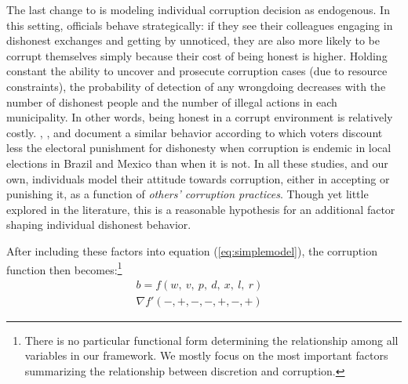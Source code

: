 \documentclass[11pt]{article}
\begin{document}
The last change to \citet{OlkenCorruptionDevelopingCountries2012b} is modeling individual corruption decision as endogenous. In this setting, officials behave strategically: if they see their colleagues engaging in dishonest exchanges and getting by unnoticed, they are also more likely to be corrupt themselves simply because their cost of being honest is higher. Holding constant the ability to uncover and prosecute corruption cases (due to resource constraints), the probability of detection of any wrongdoing decreases with the number of dishonest people and the number of illegal actions in each municipality. In other words, being honest in a corrupt environment is relatively costly. \citet{FerrazExposingCorruptPoliticians2008b}, \citet{WintersLackingInformationCondoning2013}, and \citet{ChongDoesCorruptionInformation2015} document a similar behavior according to which voters discount less the electoral punishment for dishonesty when corruption is endemic in local elections in Brazil and Mexico than when it is not. In all these studies, and our own, individuals model their attitude towards corruption, either in accepting or punishing it, as a function of \emph{others' corruption practices}. Though yet little explored in the literature, this is a reasonable hypothesis for an additional factor shaping individual dishonest behavior.

After including these factors into equation (\ref{eq:simplemodel}), the corruption function then becomes:\footnote{There is no particular functional form determining the relationship among all variables in our framework. We mostly focus on the most important factors summarizing the relationship between discretion and corruption.}
\begin{equation} \label{eq:bribefunction}
  \begin{aligned}
    b = f(w,\ v,\ p,\ d,\ x,\ l,\ r)& \\
    \nabla f'(-,+,-,-,+,-,+)&
  \end{aligned}
\end{equation}
\end{document}
